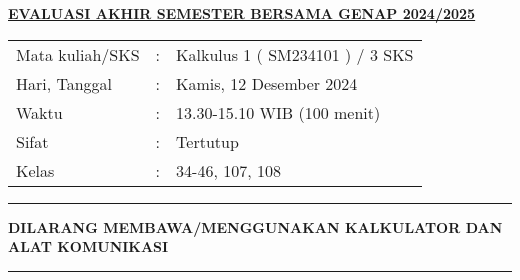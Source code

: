 \documentclass[10pt,openany,a4paper]{article}
\begin{document}
\begin{center}
    {\underline{\textbf{\MakeUppercase{Evaluasi Akhir Semester Bersama Genap 2024/2025}}}}
\end{center}

\begin{center}
    \begin{tabular}{lcl}
        Mata kuliah/SKS & : & Kalkulus 1 ( SM234101 ) / 3 SKS \\
        Hari, Tanggal   & : & Kamis, 12 Desember 2024         \\
        Waktu           & : & 13.30-15.10 WIB (100 menit)     \\
        Sifat           & : & Tertutup                        \\
        Kelas           & : & 34-46, 107, 108
    \end{tabular}
\end{center}

\noindent\rule{\textwidth}{2.pt}

\setlength{\parindent}{5pt}
\setlength{\parindent}{5pt}
\setlength{\parindent}{5pt}
\par \textbf{\MakeUppercase{dilarang membawa/menggunakan kalkulator dan alat komunikasi}}
\par {}
\noindent\rule{\textwidth}{2.pt}
\end{document}
